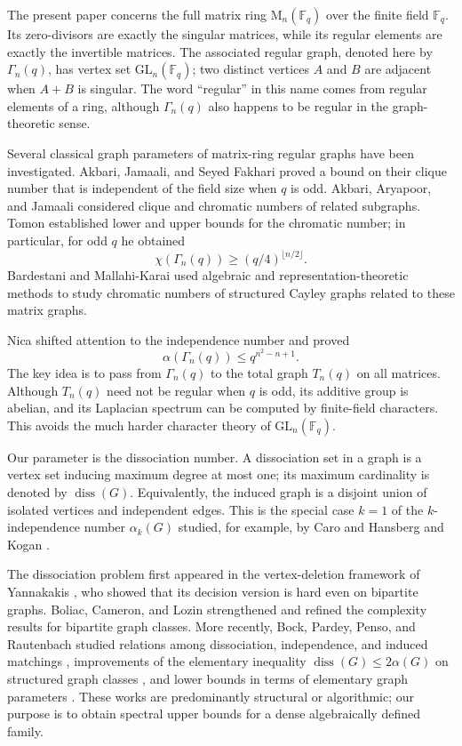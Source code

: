 \documentclass[11pt]{article}
\theoremstyle{definition}
\DeclareMathOperator{\diss}{diss}
\newcommand{\F}{\mathbb{F}}
\newcommand{\Mat}{\mathrm{M}}
\newcommand{\GL}{\mathrm{GL}}
\begin{document}
The present paper concerns the full matrix ring
$\Mat_n(\F_q)$ over the finite field $\F_q$.  Its zero-divisors are exactly
the singular matrices, while its regular elements are exactly the
invertible matrices.  The associated regular graph, denoted here by
$\Gamma_n(q)$, has vertex set $\GL_n(\F_q)$; two distinct vertices $A$ and
$B$ are adjacent when $A+B$ is singular.  The word ``regular'' in this name
comes from regular elements of a ring, although $\Gamma_n(q)$ also happens
to be regular in the graph-theoretic sense.

Several classical graph parameters of matrix-ring regular graphs have been
investigated.  Akbari, Jamaali, and Seyed Fakhari
\cite{akbari-clique} proved a bound on their clique number that is independent
of the field size when $q$ is odd.  Akbari, Aryapoor, and Jamaali
\cite{akbari-subgraphs} considered clique and chromatic numbers of related
subgraphs.  Tomon \cite{tomon} established lower and upper bounds for the
chromatic number; in particular, for odd $q$ he obtained
\[
  \chi(\Gamma_n(q))\ge (q/4)^{\lfloor n/2\rfloor}.
\]
Bardestani and Mallahi-Karai \cite{bardestani} used algebraic and
representation-theoretic methods to study chromatic numbers of structured
Cayley graphs related to these matrix graphs.

Nica \cite{nica} shifted attention to the independence number and proved
\begin{equation}\label{eq:nica-bound-intro}
  \alpha(\Gamma_n(q))\le q^{n^2-n+1}.
\end{equation}
The key idea is to pass from $\Gamma_n(q)$ to the total graph $T_n(q)$ on
all matrices.  Although $T_n(q)$ need not be regular when $q$ is odd, its
additive group is abelian, and its Laplacian spectrum can be computed by
finite-field characters.  This avoids the much harder character theory of
$\GL_n(\F_q)$.

Our parameter is the dissociation number.  A dissociation set in a graph is
a vertex set inducing maximum degree at most one; its maximum cardinality is
denoted by $\diss(G)$.  Equivalently, the induced graph is a disjoint union
of isolated vertices and independent edges.  This is the special case
$k=1$ of the $k$-independence number $\alpha_k(G)$ studied, for example, by
Caro and Hansberg \cite{caro-hansberg} and Kogan \cite{kogan}.

The dissociation problem first appeared in the vertex-deletion framework of
Yannakakis \cite{yannakakis}, who showed that its decision version is hard
even on bipartite graphs.  Boliac, Cameron, and Lozin
\cite{boliac-cameron-lozin} strengthened and refined the complexity results
for bipartite graph classes.  More recently, Bock, Pardey, Penso, and
Rautenbach studied relations among dissociation, independence, and induced
matchings \cite{bock-relating}, improvements of the elementary inequality
$\diss(G)\le2\alpha(G)$ on structured graph classes
\cite{bock-independence}, and lower bounds in terms of elementary graph
parameters \cite{bock-bound}.  These works are predominantly structural or
algorithmic; our purpose is to obtain spectral upper bounds for a dense
algebraically defined family.
\end{document}
